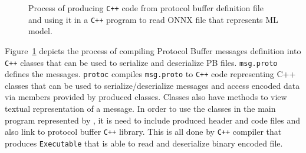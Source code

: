 \documentclass[english, 12pt, a4paper, elec, utf8, online]{aaltothesis}
\begin{document}
\begin{figure}[h!]
\caption{Process of producing \texttt{C++} code from protocol buffer definition file and using it in a \texttt{C++} program to read ONNX file that represents ML model. }\label{fig:proto_compile}
\end{figure}

Figure~\ref{fig:proto_compile} depicts the process of compiling Protocol Buffer messages definition into \texttt{C++} classes that can be used to serialize and deserialize PB files. \texttt{msg.proto} defines the messages. \texttt{protoc} compiles \texttt{msg.proto} to \texttt{C++} code representing C++ classes that can be used to serialize/deserialize messages and access encoded data via members provided by produced classes. Classes also have methods to view textual representation of a message. In order to use the classes in the main program represented by , it is need to include produced header and code files and also link to protocol buffer \texttt{C++} library. This is all done by \texttt{C++} compiler that produces \texttt{Executable} that is able to read and deserialize binary encoded  file. 
\end{document}

